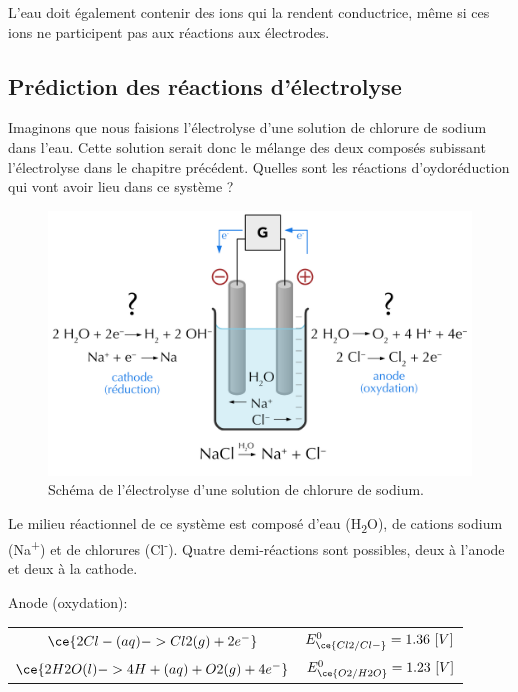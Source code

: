 \documentclass[
  11pt,
  french,
  a4paper,
  openany]{book}
\begin{document}
L'eau doit également contenir des ions qui la rendent conductrice, même si ces ions ne participent pas aux réactions aux électrodes.

\hypertarget{pruxe9diction-des-ruxe9actions-duxe9lectrolyse}{%
\subsection{Prédiction des réactions d'électrolyse}\label{pruxe9diction-des-ruxe9actions-duxe9lectrolyse}}

Imaginons que nous faisions l'électrolyse d'une solution de chlorure de sodium dans l'eau. Cette solution serait donc le mélange des deux composés subissant l'électrolyse dans le chapitre précédent. Quelles sont les réactions d'oydoréduction qui vont avoir lieu dans ce système ?

\begin{figure}

{\centering \includegraphics[width=0.65\linewidth]{images/electrolysis-NaCl-sol} 

}

\caption{Schéma de l'électrolyse d'une solution de chlorure de sodium.}\label{fig:electrolysis-water-NaCl-sol}
\end{figure}

Le milieu réactionnel de ce système est composé d'eau (H\textsubscript{2}O), de cations sodium (Na\textsuperscript{+}) et de chlorures (Cl\textsuperscript{-}). Quatre demi-réactions sont possibles, deux à l'anode et deux à la cathode.

Anode (oxydation):

\begin{longtable}[]{@{}cl@{}}
\toprule
\endhead
\(\ce{2Cl-(aq) -> Cl2(g) + 2 e^-}\) & \(E^0_{\ce{Cl2/Cl-}} = 1.36\ [V]\)\tabularnewline
\(\ce{2H2O(l) -> 4H+(aq) + O2(g) + 4 e^-}\) & \(E^0_{\ce{O2/H2O}} = 1.23\ [V]\)\tabularnewline
\bottomrule
\end{longtable}

\clearpage
\end{document}
